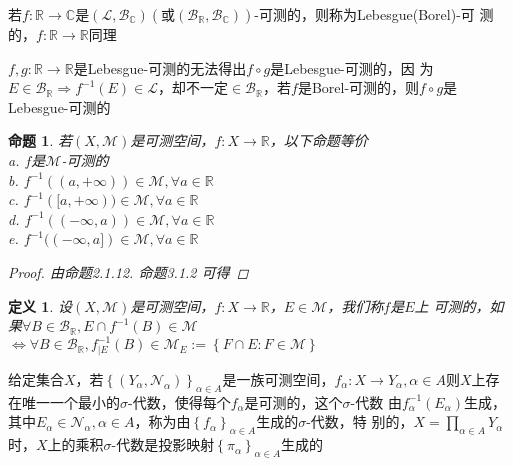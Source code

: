 \documentclass[12pt, a4paper, oneside]{ctexbook}
\newtheorem{definition}[theorem]{定义}
\newtheorem{proposition}[theorem]{命题}
\begin{document}
若$f:\mathbb{R}\to\mathbb{C}$是$(\mathcal{L},\mathcal{B}_{\mathbb{C}})(\text{或}(\mathcal{B}_{\mathbb{R}},\mathcal{B}_{\mathbb{C}}))$-可测的，则称为Lebesgue(Borel)-可
测的，$f:\mathbb{R}\to\mathbb{R}$同理

$f,g:\mathbb{R}\to\mathbb{R}$是Lebesgue-可测的无法得出$f\circ g$是Lebesgue-可测的，因
为$E\in\mathcal{B}_{\mathbb{R}}\Rightarrow f^{-1}(E)\in\mathcal{L}$，却不一定$\in\mathcal{B}_{\mathbb{R}}$，若$f$是Borel-可测的，则$f\circ 
g$是Lebesgue-可测的
\begin{proposition}
    若$(X,\mathcal{M})$是可测空间，$f:X\to\mathbb{R}$，以下命题等价\\
    a. $f$是$\mathcal{M}$-可测的\\
    b. $f^{-1}((a,+\infty))\in\mathcal{M},\forall a\in\mathbb{R}$\\
    c. $f^{-1}([a,+\infty))\in\mathcal{M},\forall a\in\mathbb{R}$\\
    d. $f^{-1}((-\infty,a))\in\mathcal{M},\forall a\in\mathbb{R}$\\
    e. $f^{-1}((-\infty,a])\in\mathcal{M},\forall a\in\mathbb{R}$\\
    \begin{proof}
        由命题2.1.12. 命题3.1.2 可得
    \end{proof}
\end{proposition}
\begin{definition}
    设$(X,\mathcal{M})$是可测空间，$f:X\to\mathbb{R}$，$E\in\mathcal{M}$，我们称$f$是$E$上
    可测的，如果$\forall B\in\mathcal{B}_{\mathbb{R}},E\cap f^{-1}(B)\in\mathcal{M}$\\
    $\Leftrightarrow \forall B\in\mathcal{B}_{\mathbb{R}},f_{|E}^{-1}(B)\in\mathcal{M}_E:=\left\{F\cap E:F\in\mathcal{M}\right\}$
\end{definition}
给定集合$X$，若$\left\{(Y_{\alpha},\mathcal{N}_{\alpha})\right\}_{\alpha\in A}$是一族可测空间，$f_{\alpha}:X\to Y_{\alpha},\alpha\in 
A$则$X$上存在唯一一个最小的$\sigma$-代数，使得每个$f_{\alpha}$是可测的，这个$\sigma$-代数
由$f_{\alpha}^{-1}(E_{\alpha})$生成，其中$E_{\alpha}\in\mathcal{N}_{\alpha},\alpha\in A$，称为由$\left\{f_{\alpha}\right\}_{\alpha\in A}$生成的$\sigma$-代数，特
别的，$X=\prod_{\alpha\in A}Y_{\alpha}$时，$X$上的乘积$\sigma$-代数是投影映射$\left\{\pi_{\alpha}\right\}_{\alpha\in A}$生成的
\end{document}
